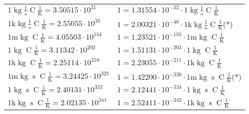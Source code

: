 \begin{center}
\begin{longtable}{l l}
{\color{black}$1 \bm{\mathrm{ }}\operatorname{kg}{}\frac1{\operatorname{s}}{\operatorname{C}}\frac1{\operatorname{K}} = 3.50515\cdot10^{31} $}   & {\color{black}$ 1 = 1.31554\cdot10^{-32} \cdot 1 \bm{\mathrm{ }}\operatorname{kg}{}\frac1{\operatorname{s}}{\operatorname{C}}\frac1{\operatorname{K}}$}  \\
{\color{gray}$1 \bm{\mathrm{ k}}\operatorname{kg}{}\frac1{\operatorname{s}}{\operatorname{C}}\frac1{\operatorname{K}} = 2.55055\cdot10^{35} $}   & {\color{gray}$ 1 = 2.00321\cdot10^{-40} \cdot 1 \bm{\mathrm{ k}}\operatorname{kg}{}\frac1{\operatorname{s}}{\operatorname{C}}\frac1{\operatorname{K}}$}\quad(*)\\
{\color{gray}$1 \bm{\mathrm{ m}}\operatorname{kg}{}{}{\operatorname{C}}\frac1{\operatorname{K}} = 4.05503\cdot10^{154} $}   & {\color{gray}$ 1 = 1.23521\cdot10^{-155} \cdot 1 \bm{\mathrm{ m}}\operatorname{kg}{}{}{\operatorname{C}}\frac1{\operatorname{K}}$}  \\
{\color{black}$1 \bm{\mathrm{ }}\operatorname{kg}{}{}{\operatorname{C}}\frac1{\operatorname{K}} = 3.11342\cdot10^{202} $}   & {\color{black}$ 1 = 1.51131\cdot10^{-203} \cdot 1 \bm{\mathrm{ }}\operatorname{kg}{}{}{\operatorname{C}}\frac1{\operatorname{K}}$}  \\
{\color{gray}$1 \bm{\mathrm{ k}}\operatorname{kg}{}{}{\operatorname{C}}\frac1{\operatorname{K}} = 2.25114\cdot10^{210} $}   & {\color{gray}$ 1 = 2.23055\cdot10^{-211} \cdot 1 \bm{\mathrm{ k}}\operatorname{kg}{}{}{\operatorname{C}}\frac1{\operatorname{K}}$}  \\
{\color{gray}$1 \bm{\mathrm{ m}}\operatorname{kg}{}{\operatorname{s}}{\operatorname{C}}\frac1{\operatorname{K}} = 3.24425\cdot10^{325} $}   & {\color{gray}$ 1 = 1.42200\cdot10^{-330} \cdot 1 \bm{\mathrm{ m}}\operatorname{kg}{}{\operatorname{s}}{\operatorname{C}}\frac1{\operatorname{K}}$}\quad(*)\\
{\color{black}$1 \bm{\mathrm{ }}\operatorname{kg}{}{\operatorname{s}}{\operatorname{C}}\frac1{\operatorname{K}} = 2.40131\cdot10^{333} $}   & {\color{black}$ 1 = 2.12441\cdot10^{-334} \cdot 1 \bm{\mathrm{ }}\operatorname{kg}{}{\operatorname{s}}{\operatorname{C}}\frac1{\operatorname{K}}$}  \\
{\color{gray}$1 \bm{\mathrm{ k}}\operatorname{kg}{}{\operatorname{s}}{\operatorname{C}}\frac1{\operatorname{K}} = 2.02135\cdot10^{341} $}   & {\color{gray}$ 1 = 2.52411\cdot10^{-342} \cdot 1 \bm{\mathrm{ k}}\operatorname{kg}{}{\operatorname{s}}{\operatorname{C}}\frac1{\operatorname{K}}$}  \\

\end{longtable}
\end{center}
